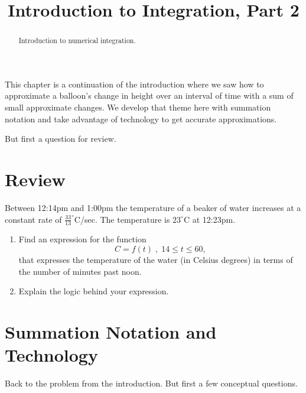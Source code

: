 \documentclass{ximera}
\title{Introduction to Integration, Part 2}
\begin{document}
\begin{abstract}
Introduction to numerical integration.
\end{abstract}
\maketitle

This chapter is a continuation of the introduction where we saw how to approximate a balloon's change in height over an interval of time with a sum of small approximate changes. We develop that theme here with summation notation and take advantage of  technology to get accurate approximations.

But first a question for review.

\section{Review}

\begin{example}  \label{Ex:IUDFr3f3fgl}
Between 12:14pm and 1:00pm the temperature of a beaker of water increases at a constant rate of $\frac{33}{13}^\circ$C/sec. The temperature is $23^\circ$C at 12:23pm.

\begin{enumerate}
\item Find an expression for the function 
\[
       C=f(t)\; , \; 14\leq t \leq 60, 
\]
that expresses the temperature of the water (in Celsius degrees) in terms of the number of minutes past noon.

\item Explain the logic behind your expression.

\end{enumerate}

\begin{freeResponse}
\end{freeResponse}
\end{example}

\section{Summation Notation and Technology}
Back to the problem from the introduction. But first a few conceptual questions.
\end{document}
